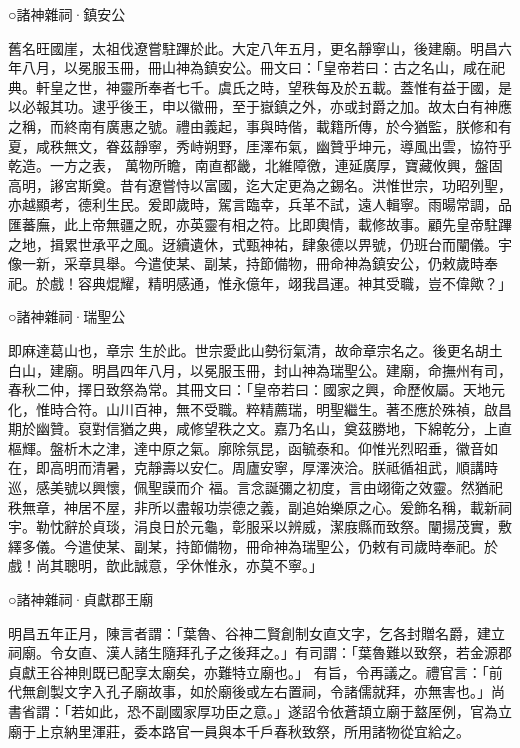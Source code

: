 \begin{pinyinscope}
 ○諸神雜祠·鎮安公



 舊名旺國崖，太祖伐遼嘗駐蹕於此。大定八年五月，更名靜寧山，後建廟。明昌六年八月，以冕服玉冊，冊山神為鎮安公。冊文曰：「皇帝若曰：古之名山，咸在祀典。軒皇之世，神靈所奉者七千。虞氏之時，望秩每及於五載。蓋惟有益于國，是以必報其功。逮乎後王，申以徽冊，至于嶽鎮之外，亦或封爵之加。故太白有神應之稱，而終南有廣惠之號。禮由義起，事與時偕，載籍所傳，於今猶監，朕修和有夏，咸秩無文，眷茲靜寧，秀峙朔野，厓澤布氣，幽贊乎坤元，導風出雲，協符乎乾造。一方之表，
 萬物所瞻，南直都畿，北維障徼，連延廣厚，寶藏攸興，盤固高明，謻宮斯奠。昔有遼嘗恃以富國，迄大定更為之錫名。洪惟世宗，功昭列聖，亦越顯考，德利生民。爰即歲時，駕言臨幸，兵革不試，遠人輯寧。雨暘常調，品匯蕃廡，此上帝無疆之貺，亦英靈有相之符。比即輿情，載修故事。顧先皇帝駐蹕之地，揖累世承平之風。迓續遺休，式甄神祐，肆象德以畀號，仍班台而闡儀。宇像一新，采章具舉。今遣使某、副某，持節備物，冊命神為鎮安公，仍敕歲時奉祀。於戲！容典焜耀，精明感通，惟永億年，翊我昌運。神其受職，豈不偉歟？」



 ○諸神雜祠·瑞聖公



 即麻達葛山也，章宗
 生於此。世宗愛此山勢衍氣清，故命章宗名之。後更名胡土白山，建廟。明昌四年八月，以冕服玉冊，封山神為瑞聖公。建廟，命撫州有司，春秋二仲，擇日致祭為常。其冊文曰：「皇帝若曰：國家之興，命歷攸屬。天地元化，惟時合符。山川百神，無不受職。粹精薦瑞，明聖繼生。著丕應於殊禎，啟昌期於幽贊。裒對信猶之典，咸修望秩之文。嘉乃名山，奠茲勝地，下綿乾分，上直樞輝。盤析木之津，達中原之氣。廓除氛昆，函毓泰和。仰惟光烈昭垂，徽音如在，即高明而清暑，克靜壽以安仁。周廬安寧，厚澤浹洽。朕祗循祖武，順講時巡，感美號以興懷，佩聖謨而介
 福。言念誕彌之初度，言由翊衛之效靈。然猶祀秩無章，神居不屋，非所以盡報功崇德之義，副追始樂原之心。爰飾名稱，載新祠宇。勒忱辭於貞琰，涓良日於元龜，彰服采以辨威，潔庪縣而致祭。闡揚茂實，敷繹多儀。今遣使某、副某，持節備物，冊命神為瑞聖公，仍敕有司歲時奉祀。於戲！尚其聰明，歆此誠意，孚休惟永，亦莫不寧。」



 ○諸神雜祠·貞獻郡王廟



 明昌五年正月，陳言者謂：「葉魯、谷神二賢創制女直文字，乞各封贈名爵，建立祠廟。令女直、漢人諸生隨拜孔子之後拜之。」有司謂：「葉魯難以致祭，若金源郡貞獻王谷神則既已配享太廟矣，亦難特立廟也。」
 有旨，令再議之。禮官言：「前代無創製文字入孔子廟故事，如於廟後或左右置祠，令諸儒就拜，亦無害也。」尚書省謂：「若如此，恐不副國家厚功臣之意。」遂詔令依蒼頡立廟于盩厔例，官為立廟于上京納里渾莊，委本路官一員與本千戶春秋致祭，所用諸物從宜給之。




\end{pinyinscope}
